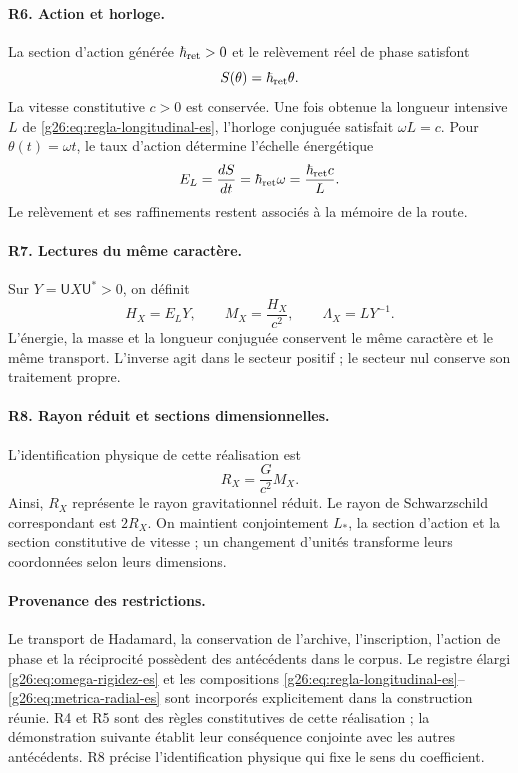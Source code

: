 \paragraph{R6. Action et horloge.}
La section d'action générée \(\hbar_{\rm ret}>0\) et le relèvement
réel de phase satisfont
\begin{equation}
 S(\theta)=\hbar_{\rm ret}\theta.
 \label{g26:eq:accion-fase-es}
\end{equation}
La vitesse constitutive \(c>0\) est conservée. Une fois obtenue la longueur intensive \(L\) de \eqref{g26:eq:regla-longitudinal-es}, l'horloge conjuguée satisfait \(\omega L=c\). Pour \(\theta(t)=\omega t\), le taux d'action détermine l'échelle énergétique
\begin{equation}
 E_{L}=\frac{dS}{dt}=\hbar_{\rm ret}\omega
   =\frac{\hbar_{\rm ret}c}{L}.
 \label{g26:eq:escala-energetica-es}
\end{equation}
Le relèvement et ses raffinements restent associés à la mémoire
de la route.

\paragraph{R7. Lectures du même caractère.}
Sur \(Y=\mathsf U X\mathsf U^*>0\), on définit
\begin{equation}
 H_X=E_{L}Y,\qquad M_X=\frac{H_X}{c^2},\qquad
 \Lambda_X=LY^{-1}.
 \label{g26:eq:lecturas-conjugadas-es}
\end{equation}
L'énergie, la masse et la longueur conjuguée conservent le même caractère
et le même transport. L'inverse agit dans le secteur positif ; le secteur
nul conserve son traitement propre.

\paragraph{R8. Rayon réduit et sections dimensionnelles.}
L'identification physique de cette réalisation est
\begin{equation}
 R_X=\frac{G}{c^2}M_X.
 \label{g26:eq:radio-reducido-es}
\end{equation}
Ainsi, \(R_X\) représente le rayon gravitationnel réduit. Le rayon de Schwarzschild correspondant est \(2R_X\). On maintient conjointement \(L_*\), la section d'action et la section constitutive de vitesse ; un changement d'unités transforme leurs coordonnées selon leurs dimensions.

\paragraph{Provenance des restrictions.}
Le transport de Hadamard, la conservation de l'archive, l'inscription,
l'action de phase et la réciprocité possèdent des antécédents dans le corpus.
Le registre élargi \eqref{g26:eq:omega-rigidez-es} et les compositions
\eqref{g26:eq:regla-longitudinal-es}--\eqref{g26:eq:metrica-radial-es} sont
incorporés explicitement dans la construction réunie. R4 et R5 sont des règles
constitutives de cette réalisation ; la démonstration suivante établit
leur conséquence conjointe avec les autres antécédents. R8 précise
l'identification physique qui fixe le sens du coefficient.

